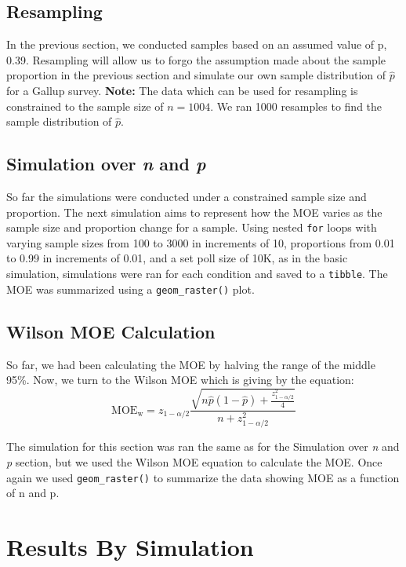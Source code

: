 \documentclass{article}\usepackage[]{graphicx}\usepackage[]{xcolor}
\begin{document}
\begin{multicols}{2}
\subsection{Resampling}
In the previous section, we conducted samples based on an assumed value of p, 0.39. Resampling will allow us to forgo the assumption made about the sample proportion in the previous section and simulate our own sample distribution of $\hat{p}$ for a Gallup survey. \textbf{Note:} The data which can be used for resampling is constrained to the sample size of $n = 1004$. We ran 1000 resamples to find the sample distribution of $\hat{p}$.

\subsection{Simulation over \textit{n} and \textit{p}}
So far the simulations were conducted under a constrained sample size and proportion. The next simulation aims to represent how the MOE varies as the sample size and proportion change for a sample. Using nested \texttt{for} loops with varying sample sizes from 100 to 3000 in increments of 10, proportions from 0.01 to 0.99 in increments of 0.01, and a set poll size of 10K, as in the basic simulation, simulations were ran for each condition and saved to a \texttt{tibble}. The MOE was summarized using a \verb|geom_raster()| plot. 

\subsection{Wilson MOE Calculation}
So far, we had been calculating the MOE by halving the range of the middle 95\%. Now, we turn to the Wilson MOE which is giving by the equation: \[\text{MOE}_{\text{w}} = z_{1-\alpha/2}\frac{ \sqrt{n\hat{p}(1-\hat{p}) + \frac{{z^2_{1-\alpha/2}}}{4}}}{n + {z^2_{1-\alpha/2}}}\]

The simulation for this section was ran the same as for the Simulation over \textit{n} and \textit{p} section, but we used the Wilson MOE equation to calculate the MOE. Once again we used \verb|geom_raster()| to summarize the data showing MOE as a function of n and p. 


\section{Results By Simulation}

\end{multicols}
\end{document}
